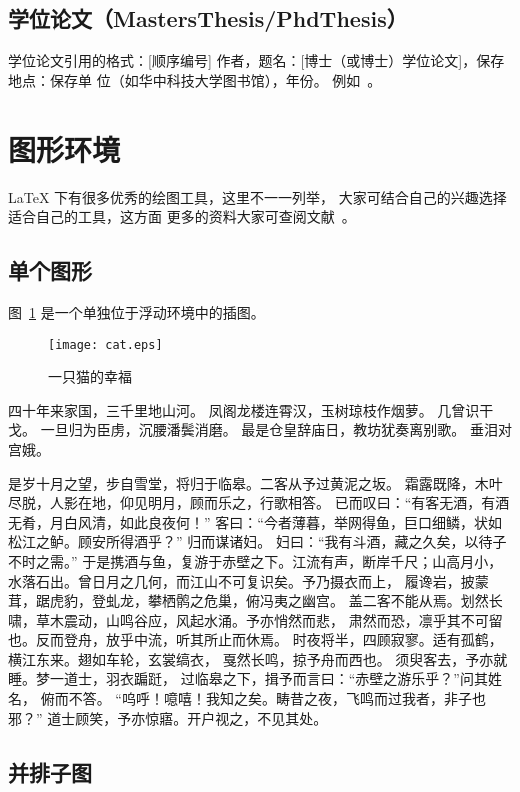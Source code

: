 \subsection{学位论文（MastersThesis/PhdThesis）}

学位论文引用的格式：[顺序编号]
作者，题名：[博士（或博士）学位论文]，保存地点：保存单
位（如华中科技大学图书馆），年份。
例如~。

\section{图形环境}

\LaTeX{} 下有很多优秀的绘图工具，这里不一一列举，
大家可结合自己的兴趣选择适合自己的工具，这方面
更多的资料大家可查阅文献~。

\subsection{单个图形}

图~\ref{fig:cat} 是一个单独位于浮动环境中的插图。
\begin{figure}[!htbp]
\centering
\texttt{[image: cat.eps]}
\caption{一只猫的幸福}\label{fig:cat}
\end{figure}

四十年来家国，三千里地山河。 凤阁龙楼连霄汉，玉树琼枝作烟萝。
几曾识干戈。 一旦归为臣虏，沉腰潘鬓消磨。
最是仓皇辞庙日，教坊犹奏离别歌。 垂泪对宫娥。

是岁十月之望，步自雪堂，将归于临皋。二客从予过黄泥之坂。
霜露既降，木叶尽脱，人影在地，仰见明月，顾而乐之，行歌相答。
已而叹曰：“有客无酒，有酒无肴，月白风清，如此良夜何！”
客曰：“今者薄暮，举网得鱼，巨口细鳞，状如松江之鲈。顾安所得酒乎？”
归而谋诸妇。 妇曰：“我有斗酒，藏之久矣，以待子不时之需。”
于是携酒与鱼，复游于赤壁之下。江流有声，断岸千尺；山高月小，
水落石出。曾日月之几何，而江山不可复识矣。予乃摄衣而上，
履谗岩，披蒙茸，踞虎豹，登虬龙，攀栖鹘之危巢，俯冯夷之幽宫。
盖二客不能从焉。划然长啸，草木震动，山鸣谷应，风起水涌。予亦悄然而悲，
肃然而恐，凛乎其不可留也。反而登舟，放乎中流，听其所止而休焉。
时夜将半，四顾寂寥。适有孤鹤，横江东来。翅如车轮，玄裳缟衣，
戛然长鸣，掠予舟而西也。 须臾客去，予亦就睡。梦一道士，羽衣蹁跹，
过临皋之下，揖予而言曰：“赤壁之游乐乎？”问其姓名， 俯而不答。
“呜呼！噫嘻！我知之矣。畴昔之夜，飞鸣而过我者，非子也邪？”
道士顾笑，予亦惊寤。开户视之，不见其处。


\subsection{并排子图}

